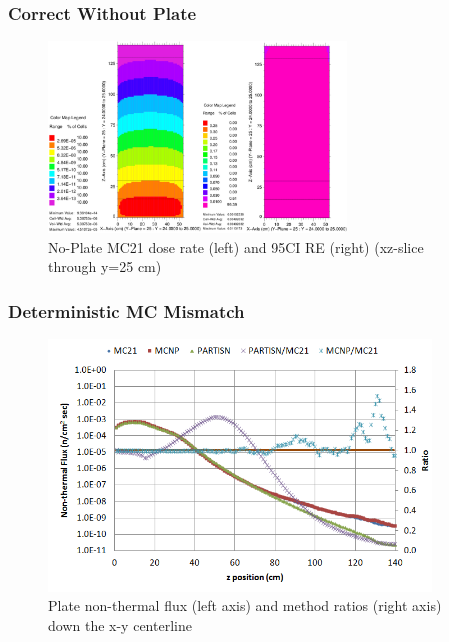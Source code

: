 \documentclass[xcolor=x11names,compress]{beamer}
\renewcommand{\(}{\begin{columns}}
\renewcommand{\)}{\end{columns}}
\newcommand{\<}[1]{\begin{column}{#1}}
\renewcommand{\>}{\end{column}}
\begin{document}
\begin{frame}[fragile]
  \frametitle{Correct Without Plate}
 \begin{figure}[p]
   \begin{center}
     \includegraphics[height=2in,clip]{NSE13-109R1-NoPlateDRandRE}
   \end{center}
   \caption{No-Plate MC21 dose rate (left) and 95CI RE (right) (xz-slice through y=25 cm)}
   \label{fig:noPlate}
 \end{figure}
\end{frame}

\begin{frame}[fragile]
  \frametitle{Deterministic MC Mismatch}
 \begin{figure}[p]
   \begin{center}
     \includegraphics[width=4in,clip]{NSE13-109R1-PlateFluxExcel}
   \end{center}
   \caption{Plate non-thermal flux (left axis) and method ratios (right axis) down the x-y centerline}
   \label{fig:PlateFlux}
 \end{figure}
\end{frame}
\end{document}
